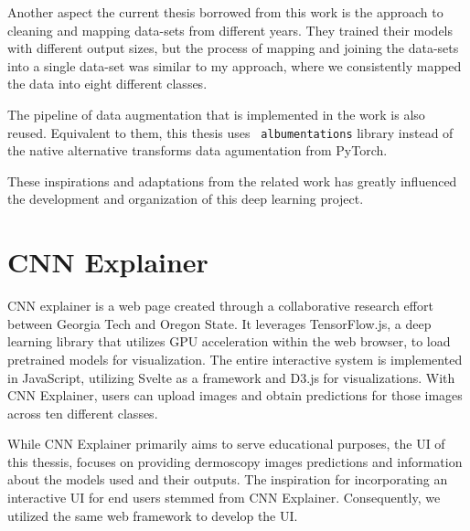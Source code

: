 Another aspect the current thesis borrowed from this work is the approach to
cleaning and mapping data-sets from different years. They trained their models
with different output sizes, but the process of mapping and joining the
data-sets into a single data-set was similar to my approach, where we
consistently mapped the data into eight different classes. \newline

The pipeline of data augmentation that is implemented in the work is also
reused. Equivalent to them, this thesis uses {\tt
albumentations}\cite{Albumentations} library instead of the native alternative
transforms data agumentation from PyTorch. \newline

These inspirations and adaptations from the related work has greatly influenced
the development and organization of this deep learning project.

\section{CNN Explainer}

CNN explainer is a web page created through a collaborative research effort
between Georgia Tech and Oregon State\cite{CNNExplainer}. It leverages
TensorFlow.js, a deep learning library that utilizes GPU acceleration within
the web browser, to load pretrained models for visualization. The entire
interactive system is implemented in JavaScript, utilizing Svelte as a
framework and D3.js for visualizations. With CNN Explainer, users can upload
images and obtain predictions for those images across ten different classes.
\newline

While CNN Explainer primarily aims to serve educational purposes, the UI of
this thessis, focuses on providing dermoscopy images predictions and
information about the models used and their outputs. The inspiration for
incorporating an interactive UI for end users stemmed from CNN Explainer.
Consequently, we utilized the same web framework to develop the UI.
